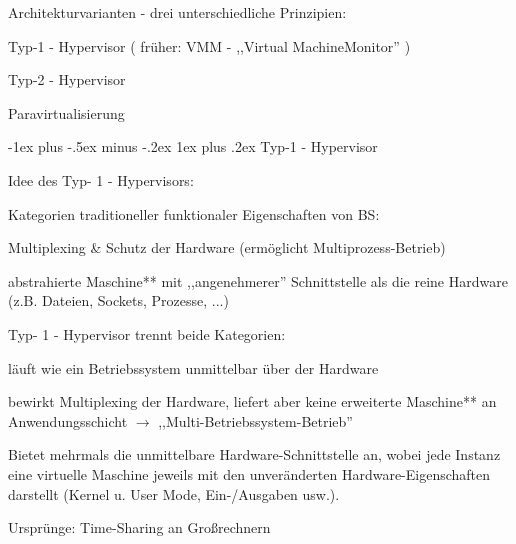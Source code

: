 \documentclass[a4paper]{article}
\makeatletter
\renewcommand{\subsubsection}{\@startsection{subsubsection}{3}{0mm}%
 {-1ex plus -.5ex minus -.2ex}%
 {1ex plus .2ex}%
 {\normalfont\small\bfseries}}
\makeatother
\begin{document}
\begin{multicols}{3}
    Architekturvarianten - drei unterschiedliche Prinzipien:

    \begin{enumerate*}
        \item Typ-1 - Hypervisor ( früher: VMM - ,,Virtual MachineMonitor'' )
        \item Typ-2 - Hypervisor
        \item Paravirtualisierung
    \end{enumerate*}


    \subsubsection{Typ-1 - Hypervisor}

    \begin{itemize*}
        \item Idee des Typ- 1 - Hypervisors:
        \begin{itemize*}
            \item Kategorien traditioneller funktionaler Eigenschaften von BS: \begin{enumerate*} \item Multiplexing \& Schutz der Hardware (ermöglicht Multiprozess-Betrieb) \item abstrahierte Maschine** mit ,,angenehmerer'' Schnittstelle als die reine Hardware (z.B. Dateien, Sockets, Prozesse, ...) \end{enumerate*}
        \end{itemize*}
        \item Typ- 1 - Hypervisor trennt beide Kategorien:
        \begin{itemize*}
            \item läuft wie ein Betriebssystem unmittelbar über der Hardware
            \item bewirkt Multiplexing der Hardware, liefert aber keine erweiterte Maschine** an Anwendungsschicht $\rightarrow$ ,,Multi-Betriebssystem-Betrieb''
        \end{itemize*}
        \item Bietet mehrmals die unmittelbare Hardware-Schnittstelle an, wobei jede
        Instanz eine virtuelle Maschine jeweils mit den unveränderten
        Hardware-Eigenschaften darstellt (Kernel u. User Mode, Ein-/Ausgaben
        usw.).
        \item Ursprünge: Time-Sharing an Großrechnern

\end{itemize*}
\end{multicols}
\end{document}
